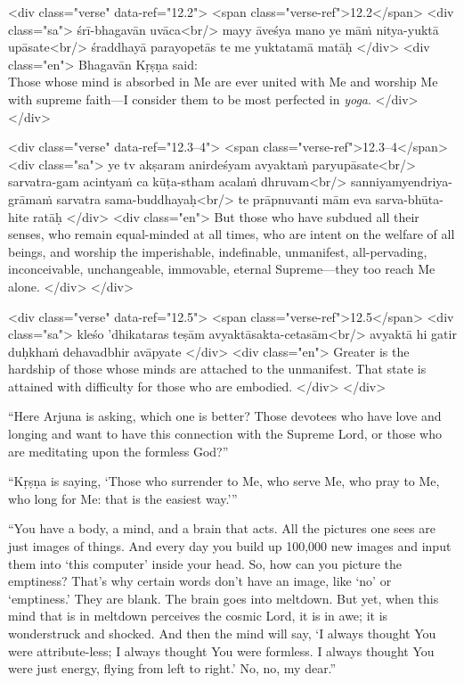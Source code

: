 \begin{html}
<div class="verse" data-ref="12.2">
  <span class="verse-ref">12.2</span>
  <div class="sa">
    śrī-bhagavān uvāca<br/>
    mayy āveśya mano ye māṁ nitya-yuktā upāsate<br/>
    śraddhayā parayopetās te me yuktatamā matāḥ
  </div>
  <div class="en">
    \hspace*{1em}Bhagavān Kṛṣṇa said: \\ Those whose mind is absorbed in Me are ever united with Me and worship Me with supreme faith---I consider them to be most perfected in \textit{yoga}.
  </div>
</div>
\end{html}



\begin{html}
<div class="verse" data-ref="12.3–4">
  <span class="verse-ref">12.3–4</span>
  <div class="sa">
    ye tv akṣaram anirdeśyam avyaktaṁ paryupāsate<br/>
    sarvatra-gam acintyaṁ ca kūṭa-stham acalaṁ dhruvam<br/>
    sanniyamyendriya-grāmaṁ sarvatra sama-buddhayaḥ<br/>
    te prāpnuvanti mām eva sarva-bhūta-hite ratāḥ
  </div>
  <div class="en">
    But those who have subdued all their senses, who remain equal-minded at all times, who are intent on the welfare of all beings, and worship the imperishable, indefinable, unmanifest, all-pervading, inconceivable, unchangeable, immovable, eternal Supreme---they too reach Me alone.
  </div>
</div>
\end{html}



\begin{html}
<div class="verse" data-ref="12.5">
  <span class="verse-ref">12.5</span>
  <div class="sa">
    kleśo ’dhikataras teṣām avyaktāsakta-cetasām<br/>
    avyaktā hi gatir duḥkhaṁ dehavadbhir avāpyate
  </div>
  <div class="en">
    Greater is the hardship of those whose minds are attached to the unmanifest. That state is attained with difficulty for those who are embodied.
  </div>
</div>
\end{html}


\enquote{Here Arjuna is asking, which one is better? Those devotees who have love and longing and want to have this connection with the Supreme Lord, or those who are meditating upon the formless God?}

\enquote{Kṛṣṇa is saying, \enquote{Those who surrender to Me, who serve Me, who pray to Me, who long for Me: that is the easiest way.}}

\enquote{You have a body, a mind, and a brain that acts. All the pictures one sees are just images of things. And every day you build up 100,000 new images and input them into \enquote{this computer} inside your head. So, how can you picture the emptiness? That’s why certain words don’t have an image, like \enquote{no} or \enquote{emptiness.} They are blank. The brain goes into meltdown. But yet, when this mind that is in meltdown perceives the cosmic Lord, it is in awe; it is wonderstruck and shocked. And then the mind will say, \enquote{I always thought You were attribute-less; I always thought You were formless. I always thought You were just energy, flying from left to right.} No, no, my dear.}

